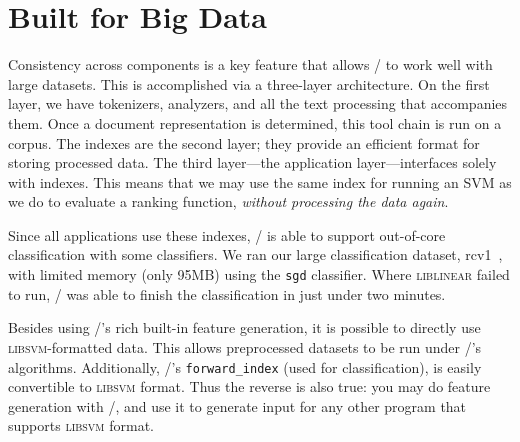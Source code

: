 \section{Built for Big Data}

Consistency across components is a key feature that allows \meta/ to work
well with large datasets. This is accomplished via a three-layer architecture.
On the first layer, we have tokenizers, analyzers, and all the text processing
that accompanies them. Once a document representation is determined, this tool
chain is run on a corpus. The indexes are the second layer; they provide an
efficient format for storing processed data. The third layer---the application
layer---interfaces solely with indexes. This means that we may use the same
index for running an SVM as we do to evaluate a ranking function, \emph{without
processing the data again}.

Since all applications use these indexes, \meta/ is able to support
out-of-core classification with some classifiers. We ran our large
classification dataset, rcv1~\cite{rcv1}, with limited memory (only 95MB) using
the \texttt{sgd} classifier.
Where \textsc{liblinear} failed to run,
\meta/ was able to finish the classification in just under two minutes.

Besides using \meta/'s rich built-in feature generation, it is possible to
directly use \textsc{libsvm}-formatted data. This allows preprocessed datasets
to be run under \meta/'s algorithms. Additionally, \meta/'s
\texttt{forward\_index} (used for classification), is easily convertible to
\textsc{libsvm} format. Thus the reverse is also true: you may do feature
generation with \meta/, and use it to generate input for any other program that
supports \textsc{libsvm} format.
